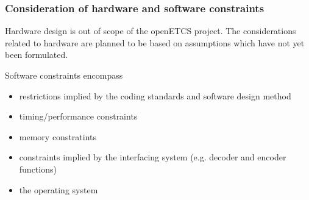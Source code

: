 \subsubsection{Consideration of hardware and software constraints}



Hardware design is out of scope of the openETCS project. 
The considerations related to hardware are planned to be based on assumptions which have not yet been formulated.

\noindent 
Software constraints encompass 

\begin{itemize}
   \item restrictions implied by the coding standards and software design method
   \item timing\slash performance constraints
   \item memory constratints 
   \item constraints implied by 
         the interfacing system (e.g. decoder and encoder functions)
   \item the operating system
\end{itemize}


